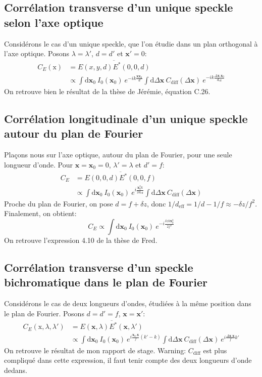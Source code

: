 \subsection{Corrélation transverse d'un unique speckle selon l'axe optique}
Considérons le cas d'un unique speckle, que l'on étudie dans un plan orthogonal à l'axe optique. Posons $\lambda = \lambda'$, $d=d'$ et $\mathbf{x}'=0$:
\begin{align}
C_E(\mathrm{x})&=\overline{E(x,y,d)E^*(0,0,d)}\\
&\propto \int{\mathrm{d}\mathbf{x}_0 \: I_0(\mathbf{x}_0) \: e^{-ik\frac{\mathbf{x} \mathbf{x}_0}{d}} \int{\mathrm{d}\Delta\mathbf{x} \: C_{\mathrm{diff}}(\Delta\mathbf{x})\: e^{-ik\frac{\Delta\mathbf{x}.\mathbf{x}_0}{d_{\mathrm{eff}}}}}}
\end{align}
On retrouve bien le résultat de la thèse de Jérémie, équation C.26.

\subsection{Corrélation longitudinale d'un unique speckle autour du plan de Fourier}
Plaçons nous sur l'axe optique, autour du plan de Fourier, pour une seule longueur d'onde. Pour $\mathbf{x}=\mathbf{x}_0=0$, $\lambda'=\lambda$ et $d'=f$:
\begin{align}
C_E&=\overline{E(0,0,d)E^*(0,0,f)} \\
& \propto \int{\mathrm{d}\mathbf{x}_0 \: I_0(\mathbf{x}_0) \: e^{i\frac{\mathbf{x}_0^2 k}{2 d_{\mathrm{eff}}}} \int{\mathrm{d}\Delta\mathbf{x} \: C_{\mathrm{diff}}(\Delta\mathbf{x})}}
\end{align}
Proche du plan de Fourier, on pose $d=f+\delta z$, donc $1/d_{\mathrm{eff}}=1/d-1/f\approx-\delta z/f^2$. Finalement, on obtient:
\begin{equation}
C_E \propto \int{\mathrm{d}\mathbf{x}_0 \: I_0(\mathbf{x}_0) \: e^{-i\frac{\delta z k \mathbf{x}_0^2}{2f^2}}}
\end{equation}
On retrouve l'expression 4.10 de la thèse de Fred.

\subsection{Corrélation transverse d'un speckle bichromatique dans le plan de Fourier}
Considérons le cas de deux longueurs d'ondes, étudiées à la même position dans le plan de Fourier. Posons $d=d'=f$, $\mathbf{x}=\mathbf{x}'$:
\begin{align}
C_E(\mathrm{x},\lambda,\lambda')&=\overline{E(\mathbf{x},\lambda)E^*(\mathbf{x},\lambda')}\\
&\propto \int{\mathrm{d}\mathbf{x}_0 \: I_0(\mathbf{x}_0) \: e^{i\frac{\mathbf{x}_0.\mathbf{x}}{f}(k'-k)} \int{\mathrm{d}\Delta\mathbf{x} \: C_{\mathrm{diff}}(\Delta\mathbf{x}) \: e^{i\frac{\Delta\mathbf{x}.\mathbf{x}}{f}k'}}}
\end{align}
On retrouve le résultat de mon rapport de stage. Warning: $C_{\mathrm{diff}}$ est plus compliqué dans cette expression, il faut tenir compte des deux longueurs d'onde dedans.

